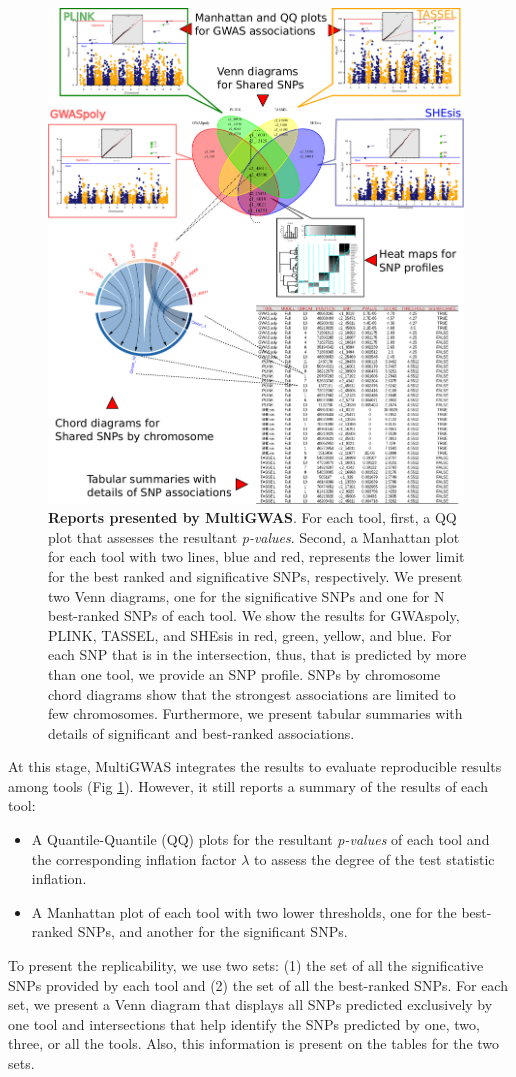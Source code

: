 \documentclass{article}
\begin{document}
\begin{figure}
\includegraphics[width=11cm]{images/report-methodologies-all-plots} \caption{\textbf{Reports presented by MultiGWAS}. For each tool, first, a QQ plot that assesses the resultant \emph{p-values}. Second, a Manhattan plot for each tool with two lines, blue and red, represents the lower limit for the best ranked and significative SNPs, respectively. We present two Venn diagrams, one for the significative SNPs and one for N best-ranked SNPs of each tool. We show the results for GWAspoly, PLINK, TASSEL, and SHEsis in red, green, yellow, and blue. For each SNP that is in the intersection, thus, that is predicted by more than one tool, we provide an SNP profile. SNPs by chromosome chord diagrams show that the strongest associations are limited to few chromosomes. Furthermore, we present tabular summaries with details of significant and best-ranked associations.\label{fig: Reports} }
\end{figure}
At this stage, MultiGWAS integrates the results to evaluate reproducible results among tools (Fig \ref{fig: Reports}). However, it still reports a summary of the results of each tool: 
\begin{itemize}
\item A Quantile-Quantile (QQ) plots for the resultant \emph{p-values} of each tool and the corresponding inflation factor $\lambda$ to assess the degree of the test statistic inflation. 
\item A Manhattan plot of each tool with two lower thresholds, one for the best-ranked SNPs, and another for the significant SNPs. 
\end{itemize}
To present the replicability, we use two sets: (1) the set of all the significative SNPs provided by each tool and (2) the set of all the best-ranked SNPs. For each set, we present a Venn diagram that displays all SNPs predicted exclusively by one tool and intersections that help identify the SNPs predicted by one, two, three, or all the tools. Also, this information is present on the tables for the two sets.
\end{document}
